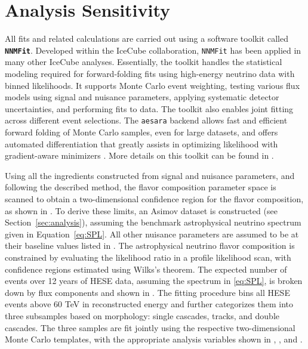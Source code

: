 \section{Analysis Sensitivity}
\label{sec:sensitivty}
All fits and related calculations are carried out using a software toolkit called \textbf{\texttt{NNMFit}}. Developed within the IceCube collaboration, \texttt{NNMFit} has been applied in many other IceCube analyses. Essentially, the toolkit handles the statistical modeling required for forward-folding fits using high-energy neutrino data with binned likelihoods. It supports Monte Carlo event weighting, testing various flux models using signal and nuisance parameters, applying systematic detector uncertainties, and performing fits to data. The toolkit also enables joint fitting across different event selections. The \texttt{aesara} backend  allows fast and efficient forward folding of Monte Carlo samples, even for large datasets, and offers automated differentiation that greatly assists in optimizing likelihood with gradient-aware minimizers . More details on this toolkit can be found in . 

Using all the ingredients constructed from signal and nuisance parameters, and following the described method, the flavor composition parameter space is scanned to obtain a two-dimensional confidence region for the flavor composition, as shown in . To derive these limits, an Asimov dataset is constructed (see Section~\ref{sec:analysis}), assuming the benchmark astrophysical neutrino spectrum given in Equation~\ref{eq:SPL}. All other nuisance parameters are assumed to be at their baseline values listed in . The astrophysical neutrino flavor composition is constrained by evaluating the likelihood ratio in a profile likelihood scan, with confidence regions estimated using Wilks’s theorem. The expected number of events over 12 years of HESE data, assuming the spectrum in \ref{eq:SPL}, is broken down by flux components and shown in . The fitting procedure bins all HESE events above 60 TeV in reconstructed energy and further categorizes them into three subsamples based on morphology: single cascades, tracks, and double cascades. The three samples are fit jointly using the respective two-dimensional Monte Carlo templates, with the appropriate analysis variables shown in , , and .


